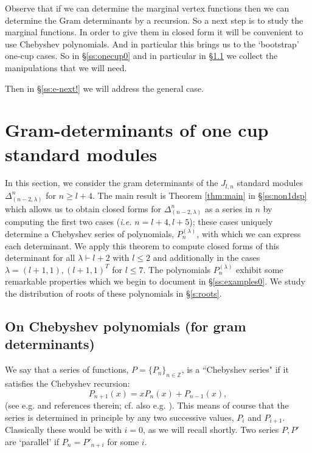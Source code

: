 \documentclass{article}
\newcommand{\ppm}[1]{\textcolor{red}{#1}}
\newcommand{\bajm}[1]{\textcolor{blue}{#1}}
\newcommand{\bajmm}[1]{#1}
\theoremstyle{definition}
\newcommand{\beq}{\begin{equation}}
\newcommand{\eq}{\end{equation}}
\newcommand{\Deltaa}{\Delta}   %
\def\l{\lambda}
\def\Z{\mathbb{Z}}
\numberwithin{equation}{subsection}
\begin{document}
Observe that if we can determine the marginal vertex functions then we can determine the \bajmm{G}ram determinants by a recursion. %
So a next step is to study the marginal functions. 
In order to give them in closed form it will be convenient to use Chebyshev polynomials. 
And in particular this brings us to the `bootstrap' one-cup cases. 
So in 
\S\ref{ss:onecup0} and in particular in 
\S\ref{ss:cheby0} we collect the manipulations that we will need. 

Then in \S\ref{ss:e-next!} we will address the general case. 



\section{Gram-determinants of one cup standard modules}  \label{s:onecup0}

In this section, we consider the gram determinants of the $J_{l,n}$ standard modules $\Deltaa_{(n-2,\l)}^{n}$ for $n\geq l+4$. The main result is Theorem \ref{thm:main} in \S\ref{ss:non1dsp} which allows us to obtain closed forms for $\Deltaa_{(n-2,\l)}^{n}$ as a series in $n$ by computing the first two cases (\textit{i.e.} $n=l+4,l+5$); these cases uniquely determine a Chebyshev series of polynomials, $P^{(\l)}_{n}$, with which we can express each determinant. We apply this theorem to compute closed forms of this determinant for all $\l\vdash l+2$ with $l\leq 2$ and additionally in the cases $\l=(l+1,1), (l+1,1)^T$ for $l\leq 7$. The polynomials $P^{(\l)}_{n}$ exhibit some remarkable properties which we begin to document in \S\ref{ss:examples0}. We study the distribution of roots of these polynomials in \S\ref{s:roots}.

\subsection{On Chebyshev polynomials (for gram determinants)}  \label{ss:cheby0}


\bajmm{We say that a series of functions, $P=\{ P_n\}_{n\in \Z}$, is a ``Chebyshev series" if it satisfies the Chebyshev recursion:}
\beq \label{eq:Cheby0} 
P_{n+1}(x) = x P_{n}(x) +P_{n-1} (x)   ,
\eq  
(see e.g. \cite[\S6.3.3]{Martin91} and references therein; cf. also e.g. \cite{KarlinStudden}).
This means of course that the series is 
determined in principle by any two successive values, $P_i$ and $P_{i+1}$. 
Classically these would be with $i=0$, as we will recall shortly. 
Two series $P,P'$ are `parallel' if $P_n = P'_{n+i}$ for some $i$. 
\end{document}
